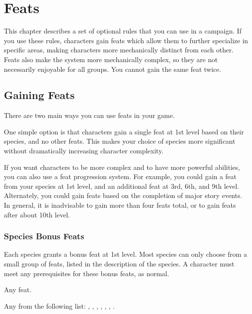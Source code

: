 \chapter{Feats}\label{Feats}

This chapter describes a set of optional rules that you can use in a campaign.
If you use these rules, characters gain feats which allow them to further specialize in specific areas, making characters more mechanically distinct from each other.
Feats also make the system more mechanically complex, so they are not necessarily enjoyable for all groups.
You cannot gain the same feat twice.

\section{Gaining Feats}
    There are two main ways you can use feats in your game.

    One simple option is that characters gain a single feat at 1st level based on their species, and no other feats.
    This makes your choice of species more significant without dramatically increasing character complexity.

    If you want characters to be more complex and to have more powerful abilities, you can also use a feat progression system.
    For example, you could gain a feat from your species at 1st level, and an additional feat at 3rd, 6th, and 9th level.
    Alternately, you could gain feats based on the completion of major story events.
    In general, it is inadvisable to gain more than four feats total, or to gain feats after about 10th level.

    \subsection{Species Bonus Feats}\label{Species Bonus Feats}
        Each species grants a bonus feat at 1st level. Most species can only choose from a small group of feats, listed in the description of the species. A character must meet any prerequisites for these bonus feats, as normal.

         Any feat.

         Any from the following list: , , , , , , .

